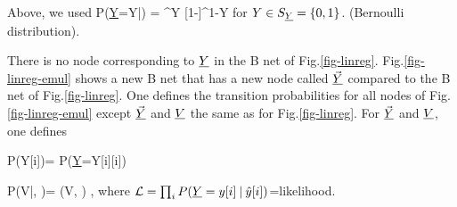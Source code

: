 Above, we used 
\beq
P(\ul{Y}=Y|) = ^{Y}
[1-]^{1-Y}
\eeq
for $Y\in S_{\underline{Y}}=\{0,1\}$. (Bernoulli distribution).

There is no node corresponding to $\underline{Y}$
in the B net of Fig.\ref{fig-linreg}. Fig.\ref{fig-linreg-emul} shows a new B net that has a new node called $\vec{\underline{Y}}$ compared to the B net of Fig.\ref{fig-linreg}. One defines the transition probabilities for all nodes of Fig.\ref{fig-linreg-emul} except $\vec{\underline{Y}}$ and $\underline{V}$ the same as for Fig.\ref{fig-linreg}. For $\vec{\underline{Y}}$ and $\underline{V}$, one defines

\beq\color{blue}
P(Y[i]\cond {})=
P(\ul{Y}=Y[i]\cond {}[i])
\eeq

\beq\color{blue}
P(V|, \vecy)=
\delta(V, \log \call)
\;,
\eeq
where ${\cal L} =\prod_i P(\underline{Y}=y[i]{\:\mathbf{|}\:} \hat{y}[i] )$=likelihood.





